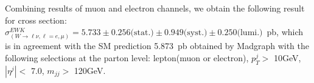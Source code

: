 

%

Combining results of muon and electron channels, we obtain
the following result for cross section:
$\sigma^{EWK}_{(W\to\ell\nu, \ell=e,\mu)} =  5.733 \pm  0.256\text{(stat.)} \pm 0.949\text{(syst.)}  \pm 0.250\text{(lumi.)}$~pb, 
which is in agreement with the SM prediction 5.873~pb obtained by Madgraph with the following selections at the parton level: lepton(muon or electron), $p_{T}^{j} > $ 10GeV, $|\eta^{j}| < $  7.0, $m_{jj} > $ 120GeV.
